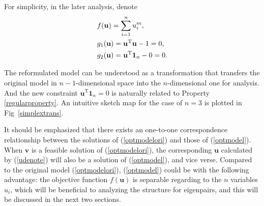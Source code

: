  
 
 
 For   simplicity,  in the later  analysis, denote  
\begin{align}
\notag
 & f (\mathbf u) = \sum_{i=1}^{n}  u_{i}^{m}, \\ 
&\nonumber   g_{1}(\mathbf u) =  \mathbf u^{\mathrm T}\mathbf u -1 = 0,  \\
&\nonumber  g_{2}(\mathbf u) = \mathbf u^{\mathrm T}\mathbf 1_{n}-0 = 0 .  
 \end{align}

 
 The  reformulated  model  can  be 
 understood as    a  transformation   that  transfers    the  original model  in $n-1$-dimensional  space  into 
 the $n$-dimensional one  for  analysis. 
And  the  new  constraint  
 $  \mathbf   u^{\mathrm T}   \mathbf   1_{n} =0 $
 is  naturally  related  to   Property  \ref{regularproperty}.
 	An intuitive  sketch map 
 for the case of $n=3$  is  plotted  in  Fig~\ref{simplextrans}.
 
 It should be emphasized that 
 there exists an one-to-one  correspondence relationship 
 between 
 the solutions of 
 (\ref{optmodelori})  and
 those of 
  (\ref{optmodel}).
 When 
 $ \mathbf v$ is a feasible solution of  (\ref{optmodelori}), 
 the corresponding $\mathbf u$ calculated by 
 (\ref{udenote}) 
 will also be a solution of (\ref{optmodel}), and vice verse. 
 Compared to the original  model (\ref{optmodelori}), 
   (\ref{optmodel}) 
   could be 
   with the  following advantage:
   the objective function $f (\mathbf u)$  is 
   separable regarding to the $n$ variables  $u_{i}$, 
  which will be beneficial  to  analyzing 
  the structure 
  for eigenpairs, and this  will be discussed in the   next  two  sections. 
 
